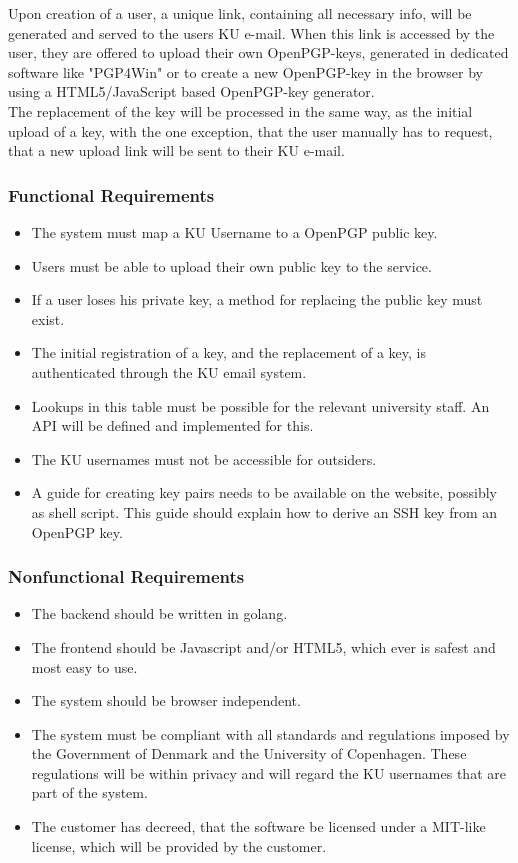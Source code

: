 \documentclass[11pt,a4paper]{article}
\begin{document}
Upon creation of a user, a unique link, containing all necessary info, will be generated and served to the users KU e-mail. When this link is accessed by the user, they are offered to upload their own OpenPGP-keys, generated in dedicated software like "PGP4Win" or to create a new OpenPGP-key in the browser by using a HTML5/JavaScript based OpenPGP-key generator.\\

The replacement of the key will be processed in the same way, as the initial upload of a key, with the one exception, that the user manually has to request, that a new upload link will be sent to their KU e-mail.


\subsubsection{Functional Requirements}
\begin{itemize}
\item The system must map a KU Username to a OpenPGP public key.
\item Users must be able to upload their own public key to the service.
\item If a user loses his private key, a method for replacing the public key must exist.
\item The initial registration of a key, and the replacement of a key, is authenticated through the KU email system.
\item Lookups in this table must be possible for the relevant university staff. An API will be defined and implemented for this.
\item The KU usernames must not be accessible for outsiders.
\item A guide for creating key pairs needs to be available on the website, possibly as shell script. This guide should explain how to derive an SSH key from an OpenPGP key.
\end{itemize}
\subsubsection{Nonfunctional Requirements}
\begin{itemize}
\item The backend should be written in golang.
\item The frontend should be Javascript and/or HTML5, which ever is safest and most easy to use.
\item The system should be browser independent.
\item The system must be compliant with all standards and regulations imposed by the Government of Denmark and the University of Copenhagen. These regulations will be within privacy and will regard the KU usernames that are part of the system.
\item The customer has decreed, that the software be licensed under a MIT-like license, which will be provided by the customer.
\end{itemize}
\end{document}
